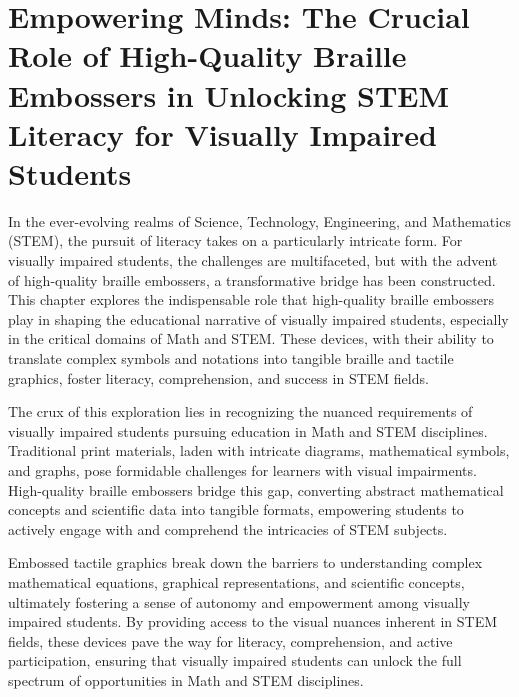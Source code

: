 \chapter{Empowering Minds: The Crucial Role of High-Quality Braille Embossers in Unlocking STEM Literacy for Visually Impaired Students}\label{chap:braille-embossers}

In the ever-evolving realms of Science, Technology, Engineering, and Mathematics (STEM), the pursuit of literacy takes on a particularly intricate form. For visually impaired students, the challenges are multifaceted, but with the advent of high-quality braille embossers, a transformative bridge has been constructed. This chapter explores the indispensable role that high-quality braille embossers play in shaping the educational narrative of visually impaired students, especially in the critical domains of Math and STEM. These devices, with their ability to translate complex symbols and notations into tangible braille and tactile graphics, foster literacy, comprehension, and success in STEM fields.

The crux of this exploration lies in recognizing the nuanced requirements of visually impaired students pursuing education in Math and STEM disciplines. Traditional print materials, laden with intricate diagrams, mathematical symbols, and graphs, pose formidable challenges for learners with visual impairments. High-quality braille embossers bridge this gap, converting abstract mathematical concepts and scientific data into tangible formats, empowering students to actively engage with and comprehend the intricacies of STEM subjects.

Embossed tactile graphics break down the barriers to understanding complex mathematical equations, graphical representations, and scientific concepts, ultimately fostering a sense of autonomy and empowerment among visually impaired students. By providing access to the visual nuances inherent in STEM fields, these devices pave the way for literacy, comprehension, and active participation, ensuring that visually impaired students can unlock the full spectrum of opportunities in Math and STEM disciplines.

